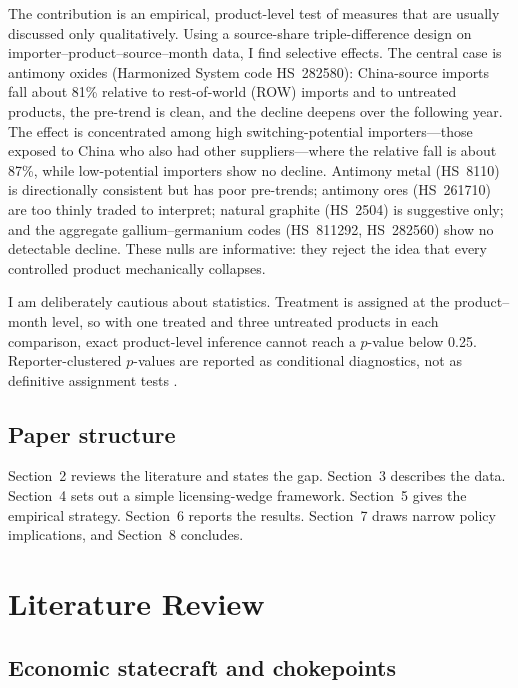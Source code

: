 \documentclass[12pt,a4paper]{article}
\begin{document}
The contribution is an empirical, product-level test of measures that are
usually discussed only qualitatively. Using a source-share triple-difference
design on importer--product--source--month data, I find selective effects. The
central case is antimony oxides (Harmonized System code HS~282580): China-source
imports fall about 81\% relative to rest-of-world (ROW) imports and to untreated
products, the pre-trend is clean, and the decline deepens over the following
year. The effect is concentrated among high switching-potential importers---those
exposed to China who also had other suppliers---where the relative fall is about
87\%, while low-potential importers show no decline. Antimony metal (HS~8110) is
directionally consistent but has poor pre-trends; antimony ores (HS~261710) are
too thinly traded to interpret; natural graphite (HS~2504) is suggestive only;
and the aggregate gallium--germanium codes (HS~811292, HS~282560) show no
detectable decline. These nulls are informative: they reject the idea that every
controlled product mechanically collapses.

I am deliberately cautious about statistics. Treatment is assigned at the
product--month level, so with one treated and three untreated products in each
comparison, exact product-level inference cannot reach a $p$-value below 0.25.
Reporter-clustered $p$-values are reported as conditional diagnostics, not as
definitive assignment tests \citep{roth2022pretest}.

\subsection{Paper structure}

Section~2 reviews the literature and states the gap. Section~3 describes the
data. Section~4 sets out a simple licensing-wedge framework. Section~5 gives the
empirical strategy. Section~6 reports the results. Section~7 draws narrow policy
implications, and Section~8 concludes.

\section{Literature Review}\label{sec:lit}

\subsection{Economic statecraft and chokepoints}
\end{document}

